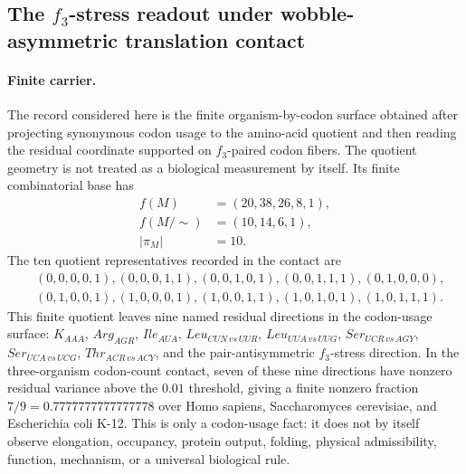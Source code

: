 \subsection{The $f_3$-stress readout under wobble-asymmetric translation contact}\label{sec:q6-f3-stress-wobble-broken-translation-readout-survival-cross-layer}

\paragraph{Finite carrier.}
The record considered here is the finite organism-by-codon surface obtained after projecting synonymous codon usage to the amino-acid quotient and then reading the residual coordinate supported on $f_3$-paired codon fibers.  The quotient geometry is not treated as a biological measurement by itself.  Its finite combinatorial base has
$$
\begin{aligned}
  f(M) &= (20,38,26,8,1),\\
  f(M/{\sim}) &= (10,14,6,1),\\
  |\pi_M| &= 10.
\end{aligned}
$$
The ten quotient representatives recorded in the contact are
$$
\begin{aligned}
&(0,0,0,0,1),(0,0,0,1,1),(0,0,1,0,1),(0,0,1,1,1),(0,1,0,0,0),\\
&(0,1,0,0,1),(1,0,0,0,1),(1,0,0,1,1),(1,0,1,0,1),(1,0,1,1,1).
\end{aligned}
$$
This finite quotient leaves nine named residual directions in the codon-usage surface: $K_{AAA}$, $Arg_{AGR}$, $Ile_{AUA}$, $Leu_{CUN\,vs\,UUR}$, $Leu_{UUA\,vs\,UUG}$, $Ser_{UCR\,vs\,AGY}$, $Ser_{UCA\,vs\,UCG}$, $Thr_{ACR\,vs\,ACY}$, and the pair-antisymmetric $f_3$-stress direction.  In the three-organism codon-count contact, seven of these nine directions have nonzero residual variance above the $0.01$ threshold, giving a finite nonzero fraction $7/9=0.7777777777777778$ over Homo sapiens, Saccharomyces cerevisiae, and Escherichia coli K-12.  This is only a codon-usage fact: it does not by itself observe elongation, occupancy, protein output, folding, physical admissibility, function, mechanism, or a universal biological rule.

